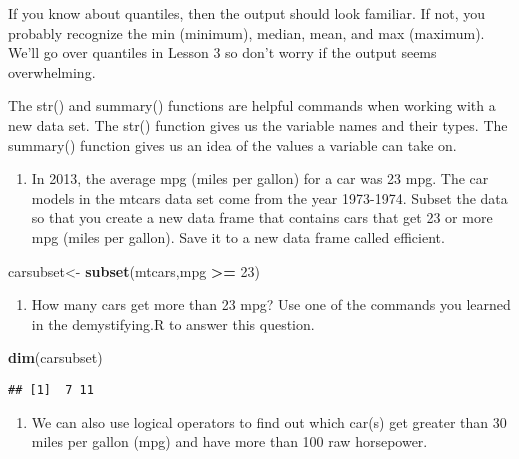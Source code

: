 \documentclass[]{article}
\newenvironment{Shaded}{\begin{snugshade}}{\end{snugshade}}
\newcommand{\KeywordTok}[1]{\textcolor[rgb]{0.13,0.29,0.53}{\textbf{#1}}}
\newcommand{\DecValTok}[1]{\textcolor[rgb]{0.00,0.00,0.81}{#1}}
\newcommand{\StringTok}[1]{\textcolor[rgb]{0.31,0.60,0.02}{#1}}
\newcommand{\OperatorTok}[1]{\textcolor[rgb]{0.81,0.36,0.00}{\textbf{#1}}}
\newcommand{\NormalTok}[1]{#1}
\providecommand{\tightlist}{%
  \setlength{\itemsep}{0pt}\setlength{\parskip}{0pt}}
\begin{document}
If you know about quantiles, then the output should look familiar. If
not, you probably recognize the min (minimum), median, mean, and max
(maximum). We'll go over quantiles in Lesson 3 so don't worry if the
output seems overwhelming.

The str() and summary() functions are helpful commands when working with
a new data set. The str() function gives us the variable names and their
types. The summary() function gives us an idea of the values a variable
can take on.

\begin{enumerate}
\def\labelenumi{\arabic{enumi}.}
\setcounter{enumi}{1}
\tightlist
\item
  In 2013, the average mpg (miles per gallon) for a car was 23 mpg. The
  car models in the mtcars data set come from the year 1973-1974. Subset
  the data so that you create a new data frame that contains cars that
  get 23 or more mpg (miles per gallon). Save it to a new data frame
  called efficient.
\end{enumerate}

\begin{Shaded}
\begin{Highlighting}[]
\NormalTok{carsubset<-}\StringTok{ }\KeywordTok{subset}\NormalTok{(mtcars,mpg }\OperatorTok{>=}\StringTok{ }\DecValTok{23}\NormalTok{)}
\end{Highlighting}
\end{Shaded}

\begin{enumerate}
\def\labelenumi{\arabic{enumi}.}
\setcounter{enumi}{2}
\tightlist
\item
  How many cars get more than 23 mpg? Use one of the commands you
  learned in the demystifying.R to answer this question.
\end{enumerate}

\begin{Shaded}
\begin{Highlighting}[]
\KeywordTok{dim}\NormalTok{(carsubset)}
\end{Highlighting}
\end{Shaded}

\begin{verbatim}
## [1]  7 11
\end{verbatim}

\begin{enumerate}
\def\labelenumi{\arabic{enumi}.}
\setcounter{enumi}{3}
\tightlist
\item
  We can also use logical operators to find out which car(s) get greater
  than 30 miles per gallon (mpg) and have more than 100 raw horsepower.
\end{enumerate}
\end{document}
